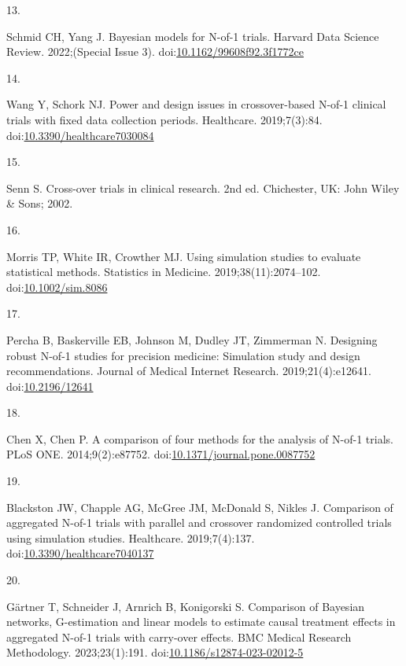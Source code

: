 \documentclass[
  11pt,
]{article}
\newlength{\cslhangindent}
\newlength{\csllabelwidth}
\newenvironment{CSLReferences}[2] %
 {\begin{list}{}{%
  \setlength{\itemindent}{0pt}
  \setlength{\leftmargin}{0pt}
  \setlength{\parsep}{0pt}
  \ifodd #1
   \setlength{\leftmargin}{\cslhangindent}
   \setlength{\itemindent}{-1\cslhangindent}
  \fi
  \setlength{\itemsep}{#2\baselineskip}}}
 {\end{list}}
\newcommand{\CSLLeftMargin}[1]{\parbox[t]{\csllabelwidth}{\strut#1\strut}}
\newcommand{\CSLRightInline}[1]{\parbox[t]{\linewidth - \csllabelwidth}{\strut#1\strut}}
\begin{document}
\begin{CSLReferences}{0}{1}
\CSLLeftMargin{13. }%
\CSLRightInline{Schmid CH, Yang J. Bayesian models for {N}-of-1 trials. Harvard Data Science Review. 2022;(Special Issue 3). doi:\href{https://doi.org/10.1162/99608f92.3f1772ce}{10.1162/99608f92.3f1772ce}}

\CSLLeftMargin{14. }%
\CSLRightInline{Wang Y, Schork NJ. Power and design issues in crossover-based {N}-of-1 clinical trials with fixed data collection periods. Healthcare. 2019;7(3):84. doi:\href{https://doi.org/10.3390/healthcare7030084}{10.3390/healthcare7030084}}

\CSLLeftMargin{15. }%
\CSLRightInline{Senn S. Cross-over trials in clinical research. 2nd ed. Chichester, UK: John Wiley \& Sons; 2002.}

\CSLLeftMargin{16. }%
\CSLRightInline{Morris TP, White IR, Crowther MJ. Using simulation studies to evaluate statistical methods. Statistics in Medicine. 2019;38(11):2074--102. doi:\href{https://doi.org/10.1002/sim.8086}{10.1002/sim.8086}}

\CSLLeftMargin{17. }%
\CSLRightInline{Percha B, Baskerville EB, Johnson M, Dudley JT, Zimmerman N. Designing robust {N}-of-1 studies for precision medicine: Simulation study and design recommendations. Journal of Medical Internet Research. 2019;21(4):e12641. doi:\href{https://doi.org/10.2196/12641}{10.2196/12641}}

\CSLLeftMargin{18. }%
\CSLRightInline{Chen X, Chen P. A comparison of four methods for the analysis of {N}-of-1 trials. PLoS ONE. 2014;9(2):e87752. doi:\href{https://doi.org/10.1371/journal.pone.0087752}{10.1371/journal.pone.0087752}}

\CSLLeftMargin{19. }%
\CSLRightInline{Blackston JW, Chapple AG, McGree JM, McDonald S, Nikles J. Comparison of aggregated {N}-of-1 trials with parallel and crossover randomized controlled trials using simulation studies. Healthcare. 2019;7(4):137. doi:\href{https://doi.org/10.3390/healthcare7040137}{10.3390/healthcare7040137}}

\CSLLeftMargin{20. }%
\CSLRightInline{Gärtner T, Schneider J, Arnrich B, Konigorski S. Comparison of {B}ayesian networks, {G}-estimation and linear models to estimate causal treatment effects in aggregated {N}-of-1 trials with carry-over effects. BMC Medical Research Methodology. 2023;23(1):191. doi:\href{https://doi.org/10.1186/s12874-023-02012-5}{10.1186/s12874-023-02012-5}}


\end{CSLReferences}
\end{document}
